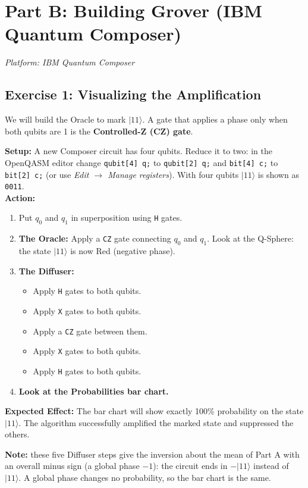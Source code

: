 \documentclass[a4paper,11pt]{article}
\begin{document}
\section{Part B: Building Grover (IBM Quantum Composer)}
\textit{Platform: IBM Quantum Composer}

\subsection{Exercise 1: Visualizing the Amplification}
We will build the Oracle to mark $|11\rangle$. A gate that applies a phase only when both qubits are 1 is the \textbf{Controlled-Z (CZ) gate}.

\begin{studentbox}
\textbf{Setup:} A new Composer circuit has four qubits. Reduce it to two: in the OpenQASM editor change \texttt{qubit[4] q;} to \texttt{qubit[2] q;} and \texttt{bit[4] c;} to \texttt{bit[2] c;} (or use \textit{Edit $\rightarrow$ Manage registers}). With four qubits $|11\rangle$ is shown as \texttt{0011}.\\
\textbf{Action:}
\begin{enumerate}
    \item Put $q_0$ and $q_1$ in superposition using \texttt{H} gates.
    \item \textbf{The Oracle:} Apply a \texttt{CZ} gate connecting $q_0$ and $q_1$. Look at the Q-Sphere: the state $|11\rangle$ is now Red (negative phase).
    \item \textbf{The Diffuser:} 
    \begin{itemize}
        \item Apply \texttt{H} gates to both qubits.
        \item Apply \texttt{X} gates to both qubits.
        \item Apply a \texttt{CZ} gate between them.
        \item Apply \texttt{X} gates to both qubits.
        \item Apply \texttt{H} gates to both qubits.
    \end{itemize}
    \item \textbf{Look at the Probabilities bar chart.}
\end{enumerate}
\textbf{Expected Effect:} The bar chart will show exactly 100\% probability on the state $|11\rangle$. The algorithm successfully amplified the marked state and suppressed the others.

\textbf{Note:} these five Diffuser steps give the inversion about the mean of Part A with an overall minus sign (a global phase $-1$): the circuit ends in $-|11\rangle$ instead of $|11\rangle$. A global phase changes no probability, so the bar chart is the same.
\end{studentbox}
\end{document}
